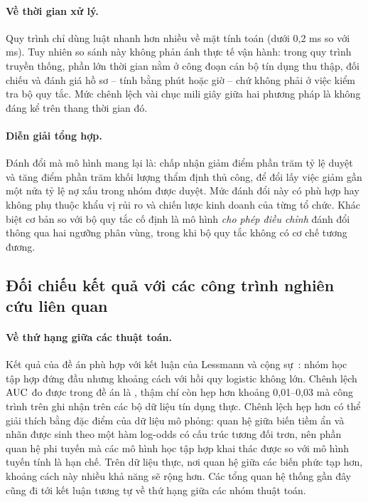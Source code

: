 \paragraph{Về thời gian xử lý.} Quy trình chỉ dùng luật nhanh hơn nhiều về mặt
tính toán (dưới 0,2 ms so với \SysMean{} ms). Tuy nhiên so sánh này không phản
ánh thực tế vận hành: trong quy trình truyền thống, phần lớn thời gian nằm ở công
đoạn cán bộ tín dụng thu thập, đối chiếu và đánh giá hồ sơ -- tính bằng phút hoặc
giờ -- chứ không phải ở việc kiểm tra bộ quy tắc. Mức chênh lệch vài chục mili
giây giữa hai phương pháp là không đáng kể trên thang thời gian đó.

\paragraph{Diễn giải tổng hợp.} Đánh đổi mà mô hình mang lại là: chấp nhận giảm
\ApproveRateDrop{} điểm phần trăm tỷ lệ duyệt và tăng \ReviewRateRise{} điểm phần
trăm khối lượng thẩm định thủ công, để đổi lấy việc giảm gần một nửa tỷ lệ nợ xấu
trong nhóm được duyệt. Mức đánh đổi này có phù hợp hay không phụ thuộc khẩu vị
rủi ro và chiến lược kinh doanh của từng tổ chức. Khác biệt cơ bản so với bộ quy
tắc cố định là mô hình \textit{cho phép điều chỉnh} đánh đổi thông qua hai ngưỡng
phân vùng, trong khi bộ quy tắc không có cơ chế tương đương.

\subsection{Đối chiếu kết quả với các công trình nghiên cứu liên quan}
\label{subsec:doi-chieu-nghien-cuu}

\paragraph{Về thứ hạng giữa các thuật toán.} Kết quả của đề án phù hợp với kết
luận của Lessmann và cộng sự~\cite{lessmann2015}: nhóm học tập hợp đứng đầu nhưng
khoảng cách với hồi quy logistic không lớn. Chênh lệch $\mathrm{AUC}$ đo được trong đề án
là \GapBestLR{}, thậm chí còn hẹp hơn khoảng 0,01--0,03 mà công trình trên ghi
nhận trên các bộ dữ liệu tín dụng thực. Chênh lệch hẹp hơn có thể giải thích bằng
đặc điểm của dữ liệu mô phỏng: quan hệ giữa biến tiềm ẩn và nhãn được sinh theo
một hàm log-odds có cấu trúc tương đối trơn, nên phần quan hệ phi tuyến mà các mô
hình học tập hợp khai thác được so với mô hình tuyến tính là hạn chế. Trên dữ
liệu thực, nơi quan hệ giữa các biến phức tạp hơn, khoảng cách này nhiều khả năng
sẽ rộng hơn. Các tổng quan hệ thống gần đây~\cite{shi2022} cũng đi tới kết luận
tương tự về thứ hạng giữa các nhóm thuật toán.

